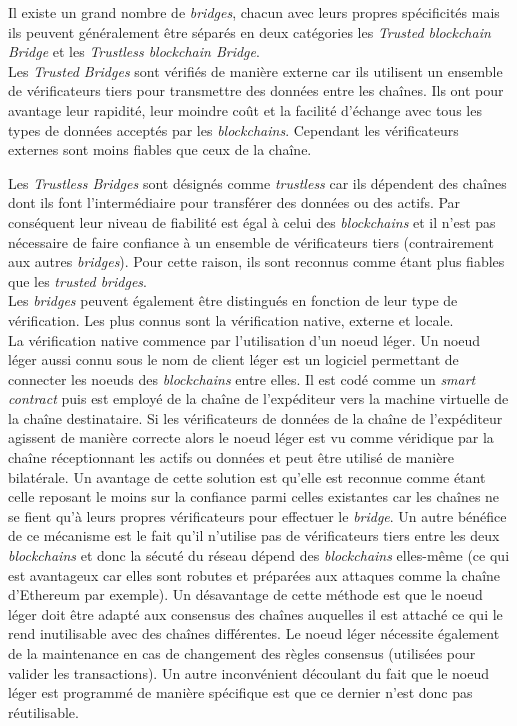 Il existe un grand nombre de \textit{bridges}, chacun avec leurs propres spécificités mais ils peuvent généralement être séparés en deux catégories les \textit{Trusted \gls{blockchain} Bridge} et les \textit{Trustless \gls{blockchain} Bridge}. \\


Les \textit{Trusted Bridges} sont vérifiés de manière externe car ils utilisent un ensemble de vérificateurs tiers pour transmettre des données entre les chaînes. Ils ont pour avantage leur rapidité, leur moindre coût et la facilité d'échange avec tous les types de données acceptés par les \textit{\gls{blockchain}s}. Cependant les vérificateurs externes sont moins fiables que ceux de la chaîne.\cite{EthereumBridges}

Les \textit{Trustless Bridges} sont désignés comme \textit{trustless} car ils dépendent des chaînes dont ils font l’intermédiaire pour transférer des données ou des \gls{actif}s. Par conséquent leur niveau de fiabilité est égal à celui des \textit{\gls{blockchain}s} et il n’est pas nécessaire de faire confiance à un ensemble de vérificateurs tiers (contrairement aux autres \textit{bridges}). Pour cette raison, ils sont reconnus comme étant plus fiables que les \textit{trusted bridges}.\cite{EthereumBridges}\\


 Les \textit{bridges} peuvent également être distingués en fonction de leur type de vérification. Les plus connus sont la vérification native, externe et locale.\cite{InteroperabilityBhuptani} \\

La vérification native commence par l’utilisation d’un noeud léger. \cite{NomadDocsNative} Un noeud léger aussi connu sous le nom de client léger est un logiciel permettant de connecter les noeuds des \textit{\gls{blockchain}s} entre elles. Il est codé comme un \textit{\gls{smart contract}} puis est employé de la chaîne de l'expéditeur vers la machine virtuelle de la chaîne destinataire. Si les vérificateurs de données de la chaîne de l'expéditeur agissent de manière correcte alors le noeud léger est vu comme véridique par la chaîne réceptionnant les \gls{actif}s ou données et peut être utilisé de manière bilatérale.
 Un avantage de cette solution est qu’elle est reconnue comme étant celle reposant le moins sur la confiance parmi celles existantes car les chaînes ne se fient qu’à leurs propres vérificateurs pour effectuer le \textit{bridge}. Un autre bénéfice de ce mécanisme est le fait qu’il n’utilise pas de vérificateurs tiers entre les deux \textit{\gls{blockchain}s} et donc la sécuté du réseau dépend des \textit{\gls{blockchain}s} elles-même (ce qui est avantageux car elles sont robutes et préparées aux attaques comme la chaîne d’Ethereum par exemple).
 Un désavantage de cette méthode est que le noeud léger doit être adapté aux consensus des chaînes auquelles il est attaché ce qui le rend inutilisable avec des chaînes différentes. Le noeud léger nécessite également de la maintenance en cas de changement des règles consensus (utilisées pour valider les transactions). Un autre inconvénient découlant du fait que le noeud léger est programmé de manière spécifique est que ce dernier n’est donc pas réutilisable. \\


